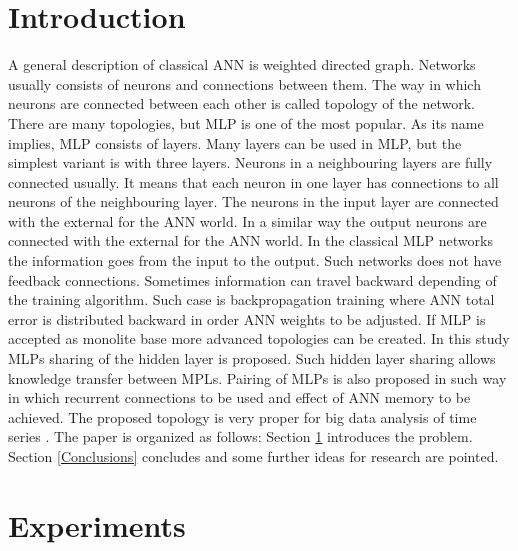 \documentclass{llncs}
\begin{document}

\section{Introduction} \label{Introduction}

A general description of classical ANN is weighted directed graph. Networks usually consists of neurons and connections between them. The way in which neurons are connected between each other is called topology of the network. There are many topologies, but MLP is one of the most popular. As its name implies, MLP consists of layers. Many layers can be used in MLP, but the simplest variant is with three layers. Neurons in a neighbouring layers are fully connected usually. It means that each neuron in one layer has connections to all neurons of the neighbouring layer. The neurons in the input layer are connected with the external for the ANN world. In a similar way the output neurons are connected with the external for the ANN world. In the classical MLP networks the information goes from the input to the output. Such networks does not have feedback connections. Sometimes information can travel backward depending of the training algorithm. Such case is backpropagation training where ANN total error is distributed backward in order ANN weights to be adjusted. If MLP is accepted as monolite base more advanced topologies can be created. In this study MLPs sharing of the hidden layer is proposed. Such hidden layer sharing allows knowledge transfer between MPLs. Pairing of MLPs is also proposed in such way in which recurrent connections to be used and effect of ANN memory to be achieved. The proposed topology is very proper for big data analysis of time series \cite{atanasova01}. The paper is organized as follows: Section \ref{Introduction} introduces the problem. Section \ref{Conclusions} concludes and some further ideas for research are pointed.

\section{Experiments} \label{Experiments}
\end{document}

